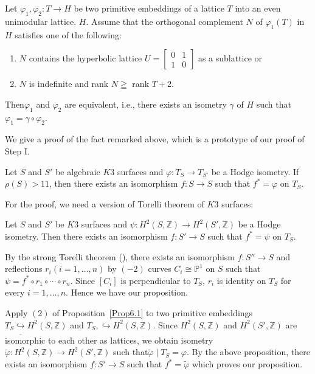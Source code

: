 \begin{Prop}\label{Prop6.1}
Let $\varphi_1,\varphi_2:T\to H$ be two primitive embeddings of a
lattice $T$ into an even unimodular lattice. $H$. Assume that the
orthogonal complement $N$ of $\varphi_1(T)$ in $H$ satisfies one of
the following:
\begin{enumerate}
\renewcommand{\labelenumi}{(\theenumi)}
\item $N$ contains the hyperbolic lattice $U=\begin{bmatrix}
0 & 1\\
1 & 0
\end{bmatrix}$ as a sublattice or 
\item $N$ is indefinite and rank $N\geqq$ rank $T+2$.
\end{enumerate}
Then\pageoriginale $\varphi_1$ and $\varphi_2$ are equivalent, i.e., there exists an
isometry $\gamma$ of $H$ such that
$\varphi_{1}=\gamma \circ \varphi_2$. 
\end{Prop}

We give a proof  of the fact remarked above, which is a prototype of
our proof of Step I.

\begin{Prop}\label{Prop6.2}
Let $S$ and $S'$ be algebraic $K3$ surfaces and $\varphi:T_S\to T_{S'}$
be  a Hodge isometry. If $\rho(S)>11$, then there exists an
isomorphism $f:S\to S$ such that $f^{\ast}=\varphi$ on $T_S$. 
\end{Prop}

For the proof, we need a version of Torelli theorem of $K3$ surfaces: 

\begin{Prop}\label{Prop6.3}
Let $S$ and $S'$ be $K3$ surfaces and $\psi:H^{2}(S,\mathbb{Z})\to
H^{2}(S',\mathbb{Z})$ be a Hodge isometry. Then there exists an
isomorphism $f:S'\to S$ such that $f^{\ast}=\psi$ on $T_S$. 
\end{Prop}

\begin{Proof}
By the strong Torelli theorem (\cite{key7}), there exists an
isomorphism $f:S''\to S$ and reflections $r_i(i=1,\ldots, n)$ by
$(-2)$ curves $C_i\cong \mathbb{P}^{1}$ on $S$ such that
$\psi=f^{\ast}\circ r_1\circ \cdots\circ r_n$. Since $[C_i]$ is
perpendicular to $T_S$, $r_i$ is identity on $T_S$ for every
$i=1,\ldots,n$. Hence we have our proposition.
\enprf
\end{Proof}

\begin{pf1}
Apply $(2)$ of
Proposition~\ref{Prop6.1} to two primitive embeddings
$T_S\underline{\hookrightarrow}H^{2}(S,\mathbb{Z})$ and $T_S,\hookrightarrow
H^{2}(S,\mathbb{Z})$. Since $H^{2}(S,\mathbb{Z})$ and
$H^{2}(S',\mathbb{Z})$ are isomorphic to each other as lattices, we
obtain isometry $\widetilde{\varphi}:H^{2}(S,\mathbb{Z})\to
H^{2}(S',\mathbb{Z})$ such that\pageoriginale $\widetilde{\varphi}\mid
T_S=\varphi$. By the above proposition, there exists an isomorphism
$f:S'\to S$ such that $f^{\ast}=\widetilde{\varphi}$ which proves our
proposition.
\enprf
\end{pf1}

